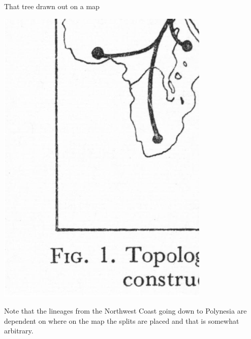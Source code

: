 \documentclass[bluish,slideColor,colorBG,pdf]{prosper}
\begin{document}
\begin{slide}[Replace]{That tree drawn out on a map}

\begin{center}
\includegraphics[width=4in]{edwardstree4.ps}
\end{center}
\bigskip

Note that the lineages from the Northwest Coast going down to Polynesia are
dependent on where on the map the splits are placed and that is somewhat
arbitrary.

\end{slide}
\end{document}
